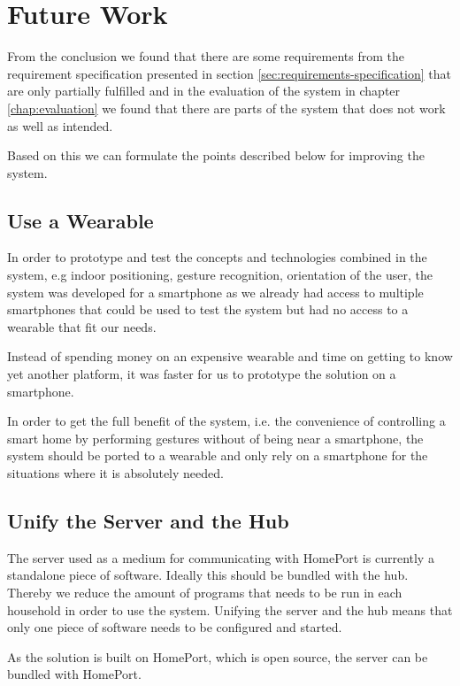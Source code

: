 \section{Future Work}\label{sec:conclusion:future-work}

From the conclusion we found that there are some requirements from the requirement specification presented in section \ref{sec:requirements-specification} that are only partially fulfilled and in the evaluation of the system in chapter \ref{chap:evaluation} we found that there are parts of the system that does not work as well as intended.

Based on this we can formulate the points described below for improving the system.

\subsection{Use a Wearable}

In order to prototype and test the concepts and technologies combined in the system, e.g indoor positioning, gesture recognition, orientation of the user, the system was developed for a smartphone as we already had access to multiple smartphones that could be used to test the system but had no access to a wearable that fit our needs.

Instead of spending money on an expensive wearable and time on getting to know yet another platform, it was faster for us to prototype the solution on a smartphone.

In order to get the full benefit of the system, i.e. the convenience of controlling a smart home by performing gestures without of being near a smartphone, the system should be ported to a wearable and only rely on a smartphone for the situations where it is absolutely needed.

\subsection{Unify the Server and the Hub}

The server used as a medium for communicating with HomePort is currently a standalone piece of software. Ideally this should be bundled with the hub. Thereby we reduce the amount of programs that needs to be run in each household in order to use the system. Unifying the server and the hub means that only one piece of software needs to be configured and started.

As the solution is built on HomePort, which is open source, the server can be bundled with HomePort.

